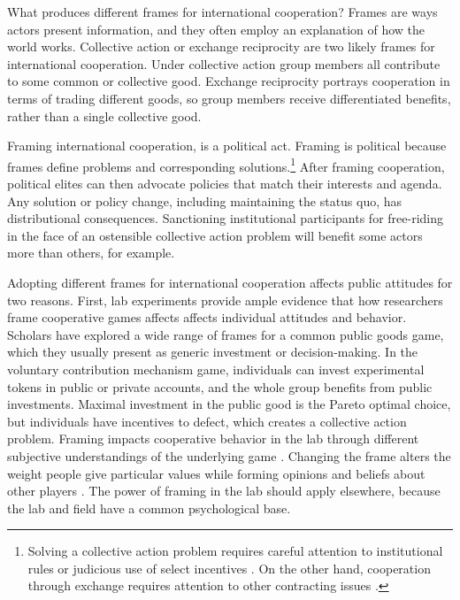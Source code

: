 \documentclass[12pt]{article}
\begin{document}
What produces different frames for international cooperation? 
Frames are ways actors present information, and they often employ an explanation of how the world works. %
Collective action or exchange reciprocity are two likely frames for international cooperation.
Under collective action group members all contribute to some common or collective good. 
Exchange reciprocity portrays cooperation in terms of trading different goods, so group members receive differentiated benefits, rather than a single collective good. 


Framing international cooperation, is a political act.  
Framing is political because frames define problems and corresponding solutions.\footnote{Solving a collective action problem requires careful attention to institutional rules \citep{Ostrom1990} or judicious use of select incentives \citep{Olson1972, Hardin1982}.
On the other hand, cooperation through exchange requires attention to other contracting issues \citep{Williamson1985}.}  
After framing cooperation, political elites can then advocate policies that match their interests and agenda.
Any solution or policy change, including maintaining the status quo, has distributional consequences. 
Sanctioning institutional participants for free-riding in the face of an ostensible collective action problem will benefit some actors more than others, for example.


Adopting different frames for international cooperation affects public attitudes for two reasons. 
First, lab experiments provide ample evidence that how researchers frame cooperative games affects affects individual attitudes and behavior. 
Scholars have explored a wide range of frames for a common public goods game, which they usually present as generic investment or decision-making. 
In the voluntary contribution mechanism game, individuals can invest experimental tokens in public or private accounts, and the whole group benefits from public investments. 
Maximal investment in the public good is the Pareto optimal choice, but individuals have incentives to defect, which creates a collective action problem.
Framing impacts cooperative behavior in the lab through different subjective understandings of the underlying game \citep{Cookson2000, CartwrightRamalingam2019}. 
Changing the frame alters the weight people give particular values while forming opinions \citep{ChongDruckman2007} and beliefs about other players \citep{Dufwenbergetal2011}.
The power of framing in the lab should apply elsewhere, because the lab and field have a common psychological base. 
\end{document}
